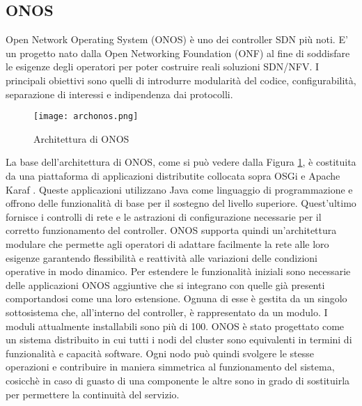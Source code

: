 \subsection{ONOS}
Open Network Operating System (ONOS) \cite{ONOS} è uno dei controller SDN più noti. 
E' un progetto nato dalla Open Networking Foundation (ONF) \cite{ONF} al fine di soddisfare le esigenze degli operatori per poter costruire reali soluzioni SDN/NFV.
I principali obiettivi sono quelli di introdurre modularità del codice, configurabilità, separazione di interessi e indipendenza dai protocolli.
\begin{figure}[h]
    \centering
   \texttt{[image: archonos.png]}
    \caption{Architettura di ONOS \cite{archonos}}
    \label{fig:img3}
\end{figure}
\newline La base dell'architettura di ONOS, come si può vedere dalla Figura \ref{fig:img3}, è costituita da una piattaforma di applicazioni distributite
collocata sopra OSGi \cite{osgi} e Apache Karaf \cite{Apache}. %
Queste applicazioni utilizzano Java come linguaggio di programmazione e offrono delle funzionalità di base per il sostegno del livello superiore.
Quest'ultimo fornisce i controlli di rete e le astrazioni di configurazione necessarie per il corretto funzionamento del controller.
\newline ONOS supporta quindi un'architettura modulare che permette agli operatori di adattare facilmente la rete alle loro esigenze 
garantendo flessibilità e reattività alle variazioni delle condizioni operative in modo dinamico.
\newline Per estendere le funzionalità iniziali sono necessarie delle applicazioni ONOS aggiuntive che si integrano con quelle già presenti comportandosi come una loro estensione. 
Ognuna di esse è gestita da un singolo sottosistema che, all'interno del controller, è rappresentato da un modulo.
I moduli attualmente installabili sono più di 100.
\newline ONOS è stato progettato come un sistema distribuito in cui tutti i nodi del cluster sono equivalenti in termini di funzionalità e capacità software.
Ogni nodo può quindi svolgere le stesse operazioni e contribuire in maniera simmetrica al funzionamento del sistema, cosicchè
in caso di guasto di una componente le altre sono in grado di sostituirla per permettere la continuità del servizio. 
